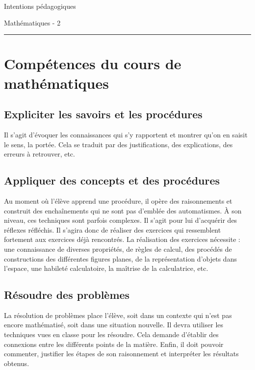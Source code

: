 \documentclass[parskip=half-, numbers=enddot]{scrartcl}
\begin{document}
\begin{center}
  \bfseries
  \begin{Huge}
    Intentions pédagogiques
  \end{Huge}
  \smallbreak
  \begin{Large}
    Mathématiques - 2\ieme
  \end{Large}
  \smallbreak
  \rule[10pt]{.3\linewidth}{1 pt}
\end{center}
\section{Compétences du cours de mathématiques}

\subsection{Expliciter les savoirs et les procédures}

Il s'agit d'évoquer les connaissances qui s'y rapportent et montrer
qu'on en saisit le sens, la portée. Cela se traduit par des
justifications, des explications, des erreurs à retrouver, etc.

\subsection{Appliquer des concepts et des procédures}

Au moment où l'élève apprend une procédure, il opère des raisonnements
et construit des enchaînements qui ne sont pas d'emblée des
automatismes. À son niveau, ces techniques sont parfois complexes. Il
s'agit pour lui d'acquérir des réflexes réfléchis. Il s'agira donc de
réaliser des exercices qui ressemblent fortement aux exercices déjà
rencontrés. La réalisation des exercices nécessite : une connaissance de
diverses propriétés, de règles de calcul, des procédés de constructions
des différentes figures planes, de la représentation d'objets dans
l'espace, une habileté calculatoire, la maîtrise de la
calculatrice, etc.

\subsection{Résoudre des problèmes}

La résolution de problèmes place l'élève, soit dans un contexte qui
n'est pas encore mathématisé, soit dans une situation nouvelle. Il devra
utiliser les techniques vues en classe pour les résoudre. Cela demande
d'établir des connexions entre les différents points de la matière.
Enfin, il doit pouvoir commenter, justifier les étapes de son
raisonnement et interpréter les résultats obtenus.
\end{document}
